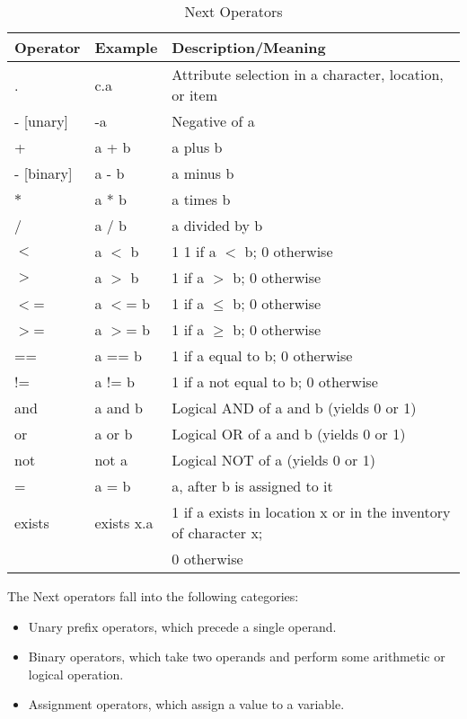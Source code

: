 \documentclass[12pt]{article}
\begin{document}
\begin{table}[htdp]
\caption{Next Operators}
\begin{center}
\begin{tabular}{|l|l|l|}
\hline
\textbf{Operator} & \textbf{Example} & \textbf{Description/Meaning} \\
\hline
.&c.a&Attribute selection in a character, location, or item \\
\hline
- [unary]& -a&Negative of a \\
\hline
+ & a + b & a plus b \\
- [binary]& a - b & a minus b\\
$*$ & a * b & a times b \\
/ & a / b & a divided by b \\
\hline
$<$ & a $<$ b & 1 1 if a $<$ b; 0 otherwise \\
$>$ & a $>$ b & 1 if a $>$ b; 0 otherwise \\
$<$= & a $<$= b& 1 if a $\leq$ b; 0 otherwise\\
$>$=& a $>$= b & 1 if a $\geq$ b; 0 otherwise \\
== & a == b& 1 if a equal to b; 0 otherwise \\
!= & a != b & 1 if a not equal to b; 0 otherwise \\
\hline
and & a and b & Logical AND of a and b (yields 0 or 1) \\
or & a or b & Logical OR of a and b (yields 0 or 1) \\
not & not a & Logical NOT of a (yields 0 or 1) \\
\hline
= & a = b & a, after b is assigned to it \\
\hline
exists & exists x.a & 1 if a exists in location x or in the inventory of character x; \\ & & 0 otherwise \\
\hline
\end{tabular}
\end{center}
\label{operators}
\end{table}%

The Next operators fall into the following categories:
\begin{itemize}
\item Unary prefix operators, which precede a single operand.
\item Binary operators, which take two operands and perform some arithmetic or logical operation.
\item Assignment operators, which assign a value to a variable.
\end{itemize}
\end{document}
